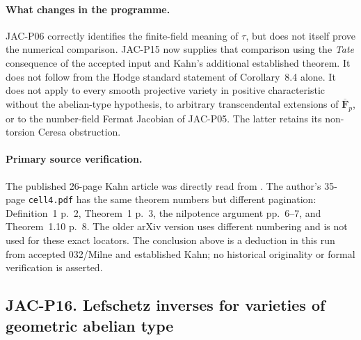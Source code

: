 \documentclass[11pt,a4paper]{article}
\begin{document}
\paragraph{What changes in the programme.}
JAC-P06 correctly identifies the finite-field meaning of $\tau$,
but does not itself prove the numerical comparison. JAC-P15 now
supplies that comparison using the \emph{Tate} consequence of the
accepted input and Kahn's additional established theorem. It
does not follow from the Hodge standard statement of Corollary~8.4
alone. It does not apply to every smooth projective variety in
positive characteristic without the abelian-type hypothesis, to
arbitrary transcendental extensions of $\overline{\mathbf F}_p$,
or to the number-field Fermat Jacobian of JAC-P05. The latter
retains its non-torsion Ceresa obstruction.

\paragraph{Primary source verification.}
The published 26-page Kahn article was directly read from
.
The author's 35-page \texttt{cell4.pdf} has the same theorem numbers
but different pagination: Definition~1 p.~2, Theorem~1 p.~3,
the nilpotence argument pp.~6--7, and Theorem~1.10 p.~8.
The older arXiv version uses different numbering and is not used
for these exact locators. The conclusion above is a deduction
in this run from accepted 032/Milne and established Kahn; no
historical originality or formal verification is asserted.



\subsection*{JAC-P16. Lefschetz inverses for varieties of geometric abelian type}
\end{document}
